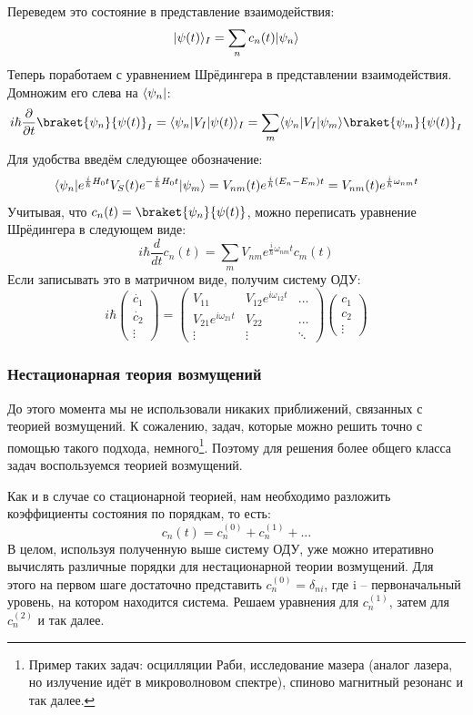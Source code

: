 Переведем это состояние в представление взаимодействия:
\[
  \lvert\psi(t)\rangle_I = \sum\limits_{n}c_n(t)\lvert\psi_n\rangle
\]
Теперь поработаем с уравнением Шрёдингера в представлении взаимодействия.
Домножим его слева на $\langle\psi_n\rvert$:
\[
  i\hbar\pd{}{t}\braket{\psi_n}{\psi(t)}_I = \bra{\psi_n}V_I\ket{\psi(t)}_I = \sum\limits_{m}\bra{\psi_n}V_I\ket{\psi_m}\braket{\psi_m}{\psi(t)}_I
\]
Для удобства введём следующее обозначение:
\[
  \langle\psi_n\rvert e^{\frac{i}{\hbar} H_0 t}V_S(t)e^{-\frac{i}{\hbar} H_0 t}\lvert\psi_m\rangle = V_{nm}(t)e^{\frac{i}{\hbar}(E_n - E_m)t} = V_{nm}(t)e^{\frac{i}{\hbar}\omega_{nm} t}
\]
Учитывая, что $c_n(t) = \braket{\psi_n}{\psi(t)}$, можно переписать уравнение
Шрёдингера в следующем виде:
\[
  i\hbar\frac{d}{dt}c_n(t) = \sum\limits_m V_{nm}e^{\frac{i}{\hbar}\omega_{nm}t}c_m(t)
\]
Если записывать это в матричном виде, получим систему ОДУ:
\[
  i\hbar\begin{pmatrix} \dot{c_1} \\ \dot{c_2} \\ \vdots \end{pmatrix} = \begin{pmatrix} V_{11} & V_{12}e^{i\omega_{12}t} & \dots \\ V_{21}e^{i\omega_{21}t} & V_{22} & \dots \\ \vdots & \vdots & \ddots \end{pmatrix} \begin{pmatrix} c_1 \\ c_2 \\ \vdots \end{pmatrix}
\]

\subsubsection{Нестационарная теория возмущений}
До этого момента мы не использовали никаких приближений, связанных с теорией
возмущений. К сожалению, задач, которые можно решить точно с помощью такого
подхода, немного\footnote{Пример таких задач: осцилляции Раби, исследование
  мазера (аналог лазера, но излучение идёт в микроволновом спектре), спиново
  магнитный резонанс и так далее.}. Поэтому для решения более общего класса задач
воспользуемся теорией возмущений.

Как и в случае со стационарной теорией, нам необходимо разложить коэффициенты
состояния по порядкам, то есть:
\[
  c_n(t) = c^{(0)}_n + c^{(1)}_n + \dots
\]
В целом, используя полученную выше систему ОДУ, уже можно итеративно вычислять
различные порядки для нестационарной теории возмущений. Для этого на первом
шаге достаточно представить $c^{(0)}_n = \delta_{ni}$, где i – первоначальный
уровень, на котором находится система. Решаем уравнения для $c^{(1)}_n$, затем
для $c^{(2)}_n$ и так далее.

